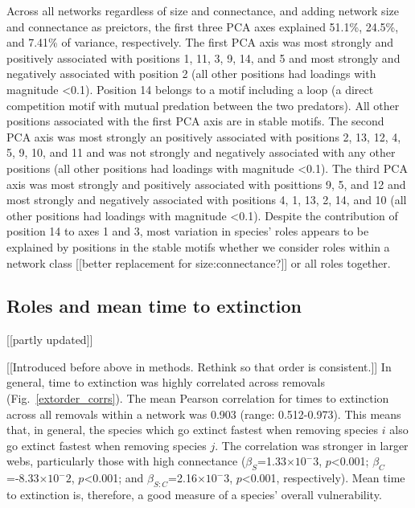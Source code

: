 \documentclass[12pt]{article}
\begin{document}
		Across all networks regardless of size and connectance, and adding network size and connectance as preictors, the first three PCA axes explained  51.1\%, 24.5\%, and 7.41\% of variance, respectively. %
		The first PCA axis was most strongly and positively associated with positions 1, 11, 3, 9, 14, and 5 and most strongly and negatively associated with position 2 (all other positions had loadings with magnitude \textless0.1). 
		Position 14 belongs to a motif including a loop (a direct competition motif with mutual predation between the two predators).
		All other positions associated with the first PCA axis are in stable motifs.
		The second PCA axis was most strongly an positively associated with positions 2, 13, 12, 4, 5, 9, 10, and 11 and was not strongly and negatively associated with any other positions (all other positions had loadings with magnitude \textless0.1). 
		The third PCA axis was most strongly and positively associated with posittions 9, 5, and 12 and most strongly and negatively associated with positions 4, 1, 13, 2, 14, and 10 (all other positions had loadings with magnitude \textless0.1). 
		Despite the contribution of position 14 to axes 1 and 3, most variation in species' roles appears to be explained by positions in the stable motifs whether we consider roles within a network class [[better replacement for size:connectance?]] or all roles together.


	\subsection*{Roles and mean time to extinction} [[partly updated]]

		[[Introduced before above in methods. Rethink so that order is consistent.]]
		In general, time to extinction was highly correlated across removals (Fig.~\ref{extorder_corrs}). %
		The mean Pearson correlation for times to extinction across all removals within a network was 0.903 (range: 0.512-0.973). %
		This means that, in general, the species which go extinct fastest when removing species $i$ also go extinct fastest when removing species $j$.
		The correlation was stronger in larger webs, particularly those with high connectance ($\beta_{S}$=1.33$\times10^-3$, $p$\textless0.001; $\beta_{C}$=-8.33$\times10^-2$, $p$\textless0.001; and $\beta_{S:C}$=2.16$\times10^-3$, $p$\textless0.001, respectively). 
		Mean time to extinction is, therefore, a good measure of a species' overall vulnerability.
\end{document}
